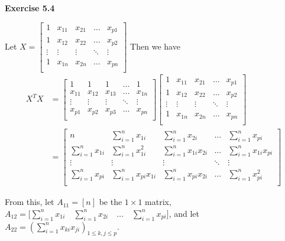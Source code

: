 \documentclass[12pt]{article}  %
\begin{document}
\textbf{Exercise 5.4}

Let $X = \begin{bmatrix}
1 & x_{11} & x_{21} & \dots & x_{p1}\\
1 & x_{12} & x_{22} & \dots & x_{p2}\\
\vdots & \vdots & \vdots & \ddots & \vdots\\
1 & x_{1n} & x_{2n}& \dots & x_{pn}\\
\end{bmatrix}$ 
Then we have 
\begin{align*}X^{T}X &= 
\begin{bmatrix}
1 & 1 & 1 & \dots & 1\\
x_{11} & x_{12} & x_{13} & \dots & x_{1n}\\
\vdots & \vdots & \vdots & \ddots & \vdots\\
x_{p1} & x_{p2} & x_{p3}& \dots & x_{pn}\\
\end{bmatrix}
\begin{bmatrix}
1 & x_{11} & x_{21} & \dots & x_{p1}\\
1 & x_{12} & x_{22} & \dots & x_{p2}\\
\vdots & \vdots & \vdots & \ddots & \vdots\\
1 & x_{1n} & x_{2n}& \dots & x_{pn}\\
\end{bmatrix} \\
&=\begin{bmatrix}
n & \sum_{i=1}^{n}x_{1i} & \sum_{i=1}^{n}x_{2i} & \dots & \sum_{i=1}^{n}x_{pi}\\
\sum_{i=1}^{n}x_{1i} & \sum_{i=1}^{n}x_{1i}^2 & \sum_{i=1}^{n}x_{1i}x_{2i}& \dots & \sum_{i=1}^{n}x_{1i}x_{pi}\\
\vdots & \vdots & \vdots & \ddots & \vdots \\
\sum_{i=1}^{n}x_{pi} & \sum_{i=1}^{n}x_{pi}x_{1i} & \sum_{i=1}^{n}x_{pi}x_{2i} & \dots & \sum_{i=1}^{n}x_{pi}^2\\
\end{bmatrix} 
\end{align*}

From this, let $A_{11} = [n]$ be the $1\times1$ matrix, $A_{12} = \big[\sum_{i=1}^{n}x_{1i} \hspace{1em} \sum_{i=1}^{n}x_{2i} \hspace{1em} \dots \hspace{1em}\sum_{i=1}^{n}x_{pi}\big]$, and let $A_{22} = (\sum_{i=1}^{n}x_{ki}x_{ji})_{1\leq k,j\leq p}$. 
\end{document}
